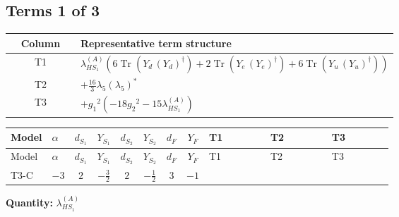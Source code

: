 \documentclass[8pt]{article}
\begin{document}
\begin{landscape}
\subsection*{Terms 1 of 3}
\begin{center}
\begin{tabular}{@{}c >{\raggedright\arraybackslash}p{0.82\linewidth}@{}}
\toprule
Column & Representative term structure \\
\midrule
T1 & \(\displaystyle {\lambda_{HS_1}^{(A)}} (6 \operatorname{Tr}\!\left({Y_d}\,\left({Y_d}\right)^{\dagger}\right)+2 \operatorname{Tr}\!\left({Y_e}\,\left({Y_e}\right)^{\dagger}\right)+6 \operatorname{Tr}\!\left({Y_u}\,\left({Y_u}\right)^{\dagger}\right))\) \\
\midrule
T2 & \(\displaystyle +\frac{16}{3} {\lambda_5} \left({\lambda_5}\right)^{*}\) \\
\midrule
T3 & \(\displaystyle +{g_1}^2 \left(-18 {g_2}^2-15 {\lambda_{HS_1}^{(A)}}\right)\) \\
\midrule
\bottomrule
\end{tabular}
\end{center}
\smallskip
\tiny
\begin{longtable}{@{}llcccccc >{\raggedright\arraybackslash}p{0.21\linewidth} >{\raggedright\arraybackslash}p{0.21\linewidth} >{\raggedright\arraybackslash}p{0.21\linewidth}@{}}
\toprule
Model & $\alpha$ & $d_{S_1}$ & $Y_{S_1}$ & $d_{S_2}$ & $Y_{S_2}$ & $d_F$ & $Y_F$ & T1 & T2 & T3 \\
\midrule
\endfirsthead
\toprule
Model & $\alpha$ & $d_{S_1}$ & $Y_{S_1}$ & $d_{S_2}$ & $Y_{S_2}$ & $d_F$ & $Y_F$ & T1 & T2 & T3 \\
\midrule
\endhead
T3-C & $-3$ & $2$ & $-\frac{3}{2}$ & $2$ & $-\frac{1}{2}$ & $3$ & $-1$ & \scriptsize\adjustbox{max width=\linewidth}{$\begin{gathered} {\lambda_{HS_1}^{(A)}} (6 \operatorname{Tr}\!\left({Y_d}\,\left({Y_d}\right)^{\dagger}\right)+2 \operatorname{Tr}\!\left({Y_e}\,\left({Y_e}\right)^{\dagger}\right)+6 \operatorname{Tr}\!\left({Y_u}\,\left({Y_u}\right)^{\dagger}\right))\end{gathered}$} & \scriptsize\adjustbox{max width=\linewidth}{$\begin{gathered} +\frac{16}{3} {\lambda_5} \left({\lambda_5}\right)^{*}\end{gathered}$} & \scriptsize\adjustbox{max width=\linewidth}{$\begin{gathered} +{g_1}^2 \left(-18 {g_2}^2-15 {\lambda_{HS_1}^{(A)}}\right)\end{gathered}$} \\
\midrule
\bottomrule
\end{longtable}
\clearpage
\noindent\textbf{Quantity: }$\lambda_{HS_1}^{(A)}$\par\smallskip

\end{landscape}
\end{document}
